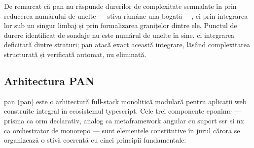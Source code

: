 De remarcat că \gls{pan} nu răspunde durerilor de complexitate semnalate în  prin reducerea numărului de unelte --- stiva rămâne una bogată ---, ci prin integrarea lor sub un singur limbaj și prin formalizarea granițelor dintre ele. Punctul de durere identificat de sondaje nu este numărul de unelte în sine, ci integrarea deficitară dintre straturi; \gls{pan} atacă exact această integrare, lăsând complexitatea structurată și verificată automat, nu eliminată.

\subsection{Arhitectura PAN}\label{subsec:pan-definitie}

\gls{pan} (\acrlong{pan}) este o arhitectură full-stack monolitică modulară pentru aplicații \gls{web} construite integral în ecosistemul \gls{typescript}.
Cele trei componente eponime --- \gls{prisma} ca \gls{orm} declarativ, \gls{analog} ca \gls{metaframework} \gls{angular} cu suport \acrshort{ssr} și \gls{nx} ca orchestrator de \gls{monorepo} --- sunt elementele constitutive în jurul cărora se organizează o stivă coerentă cu cinci principii fundamentale:

